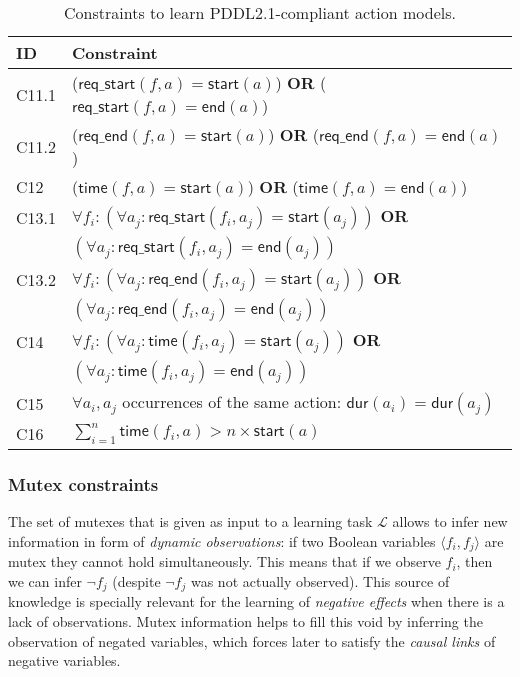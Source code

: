 \documentclass{ecai}
\newcommand{\tup}[1]{{\langle #1 \rangle}}
\newcommand{\dur}{\mathsf{dur}}    %
\newcommand{\start}{\mathsf{start}}%
\newcommand{\en}{\mathsf{end}}     %
\newcommand{\tim}{\mathsf{time}}   %
\newcommand{\reqs}{\mathsf{req\_{start}}} %
\newcommand{\reqe}{\mathsf{req\_{end}}}   %
\begin{document}
\begin{table}
\begin{center}   
\caption{Constraints to learn PDDL2.1-compliant action models.}	
\begin{scriptsize}
\begin{tabular}{ll}
\hline	
{\bf ID} &{\bf Constraint} \\ %
\hline
C11.1& ($\reqs(f,a) = \start(a)$) \textbf{OR} ($\reqs(f,a) = \en(a)$) \\%
C11.2& ($\reqe(f,a) = \start(a)$) \textbf{OR} ($\reqe(f,a) = \en(a)$) \\%
C12& ($\tim(f,a) = \start(a)$) \textbf{OR} ($\tim(f,a) = \en(a)$) \\ %
C13.1& $\forall f_i: (\forall a_j: \reqs(f_i,a_j) = \start(a_j))$ \textbf{OR} \\%
&\hspace{1.1cm}$(\forall a_j: \reqs(f_i,a_j) = \en(a_j))$ \\
C13.2& $\forall f_i: (\forall a_j: \reqe(f_i,a_j) = \start(a_j))$ \textbf{OR} \\
&\hspace{1.1cm}$(\forall a_j: \reqe(f_i,a_j) = \en(a_j))$ \\
C14& $\forall f_i: (\forall a_j: \tim(f_i,a_j) = \start(a_j))$ \textbf{OR} \\%
&\hspace{0.9cm}$(\forall a_j: \tim(f_i,a_j) = \en(a_j))$ \\
C15& $\forall a_i,a_j$ occurrences of the same action: $\dur(a_i) = \dur(a_j)$ \\ %
C16 &$\sum_{i=1}^{n} \tim(f_i,a) > n \times \start(a)$ 

\end{tabular}
\end{scriptsize}
\label{table:21constraints}
\end{center}
\end{table}


\subsubsection{Mutex constraints}
The set of mutexes that is given as input to a learning task $\mathcal{L}$ allows to infer new information in form of {\em dynamic observations}: if two Boolean variables $\tup{f_i, f_j}$ are mutex they cannot hold simultaneously. This means that if we observe $f_i$, then we can infer $\neg f_j$ (despite $\neg f_j$ was not actually observed). This source of knowledge is specially relevant for the learning of {\em negative effects} when there is a lack of observations. Mutex information helps to fill this void by inferring the observation of negated variables, which forces later to satisfy the {\em causal links} of negative variables. 
\end{document}

